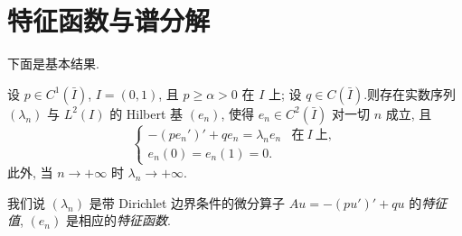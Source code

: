 \section{特征函数与谱分解}
\label{sec:8.6}

下面是基本结果.

\begin{keytheorem}
\label{thm:8.22}
设 $p\in C^1(\bar I)$, $I=(0,1)$, 且 $p\ge\alpha>0$ 在 $I$ 上; 设
$q\in C(\bar I)$.则存在实数序列 $(\lambda_n)$ 与 $L^2(I)$ 的 Hilbert 基
$(e_n)$, 使得 $e_n\in C^2(\bar I)$ 对一切 $n$ 成立, 且
\begin{equation}
\begin{cases}
-(pe_n')'+qe_n=\lambda_ne_n & \text{在}\ I\ \text{上},\\
e_n(0)=e_n(1)=0.
\end{cases}
\label{eq:8.37}
\end{equation}
此外, 当 $n\to+\infty$ 时 $\lambda_n\to+\infty$.
\end{keytheorem}

我们说 $(\lambda_n)$ 是带 Dirichlet 边界条件的微分算子
$Au=-(pu')'+qu$ 的\emph{特征值}, $(e_n)$ 是相应的\emph{特征函数}.

